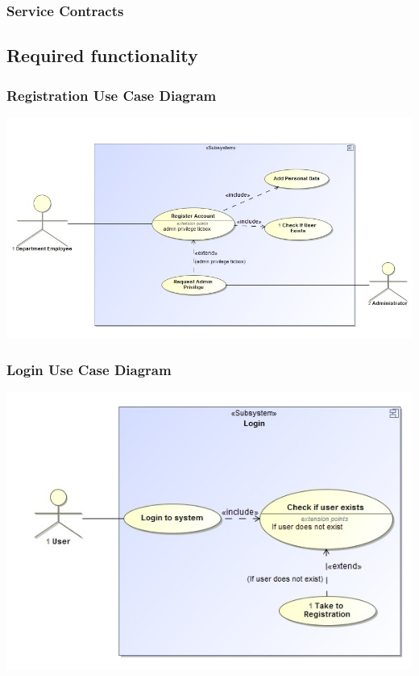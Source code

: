 \documentclass[a4paper,12pt]{article}
\begin{document}
	\subsubsection{Service Contracts}
\subsection{Required functionality}
	\subsubsection{Registration Use Case Diagram}
	\includegraphics[width=1\textwidth]{./Registration.jpg}\\[1.5cm]
	 
	\subsubsection{Login Use Case Diagram}
	\includegraphics[width=1\textwidth]{./Login.jpg}\\[1.5cm] 
	
\end{document}
